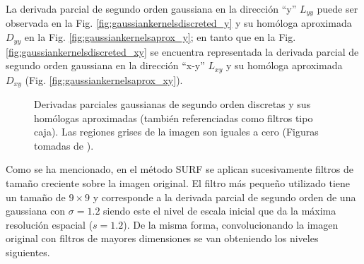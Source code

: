 La derivada parcial de segundo orden gaussiana en la dirección ``y'' $L_{yy}$ puede ser observada en la Fig. \ref{fig:gaussiankernelsdiscreted_y} y su homóloga aproximada $D_{yy}$ en la Fig. \ref{fig:gaussiankernelsaprox_y}; en tanto que en la Fig. \ref{fig:gaussiankernelsdiscreted_xy} se encuentra representada la derivada parcial de segundo orden gaussiana en la dirección ``x-y'' $L_{xy}$ y su homóloga aproximada $D_{xy}$ (Fig. \ref{fig:gaussiankernelsaprox_xy}).
\begin{figure}[tbhp]
	    \centering
		  \hspace{0.1\linewidth}
		  \hspace{0.1\linewidth}
		  \hspace{0.1\linewidth}
		  \hspace{0.1\linewidth}
	  \caption[Derivadas parciales gaussianas discretas y aproximadas]{Derivadas parciales gaussianas de segundo orden discretas y sus homólogas aproximadas (también referenciadas como filtros tipo caja). Las regiones grises de la imagen son iguales a cero (Figuras tomadas de \cite{Bay:2008:SRF}).}%
	    \label{fig:gaussiankernels}
      \end{figure}
      Como se ha mencionado, en el método SURF se aplican sucesivamente filtros de tamaño creciente sobre la imagen original. El filtro más pequeño utilizado tiene un tamaño de $9 \times 9$ y corresponde a la derivada parcial de segundo orden de una gaussiana con $\sigma=1.2$ siendo este el nivel de escala inicial que da la máxima resolución espacial ($s=1.2$). De la misma forma, convolucionando la imagen original con filtros de mayores dimensiones se van obteniendo los niveles siguientes.

